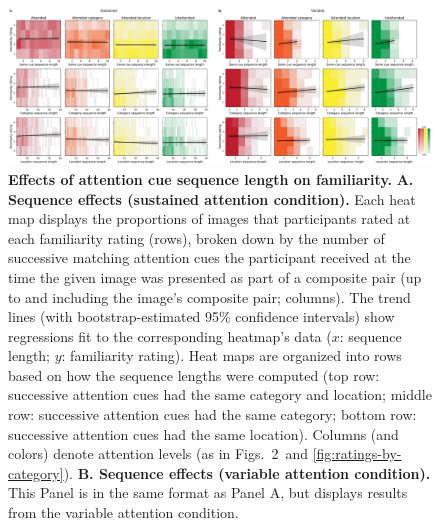 \documentclass{article}
\newcommand{\familiarity}{2}
\begin{document}
\begin{figure}[tp]
  \centering
  \includegraphics[width=1\textwidth]{figs/sequence_length_effects}

\caption{\textbf{Effects of attention cue sequence length on familiarity.} 
\textbf{A. Sequence effects (sustained attention condition).} Each heat map
displays the proportions of images that participants rated at each familiarity
rating (rows), broken down by the number of successive matching attention cues
the participant received at the time the given image was presented as part of a
composite pair (up to and including the image's composite pair; columns). The
trend lines (with bootstrap-estimated 95\% confidence intervals) show
regressions fit to the corresponding heatmap's data ($x$: sequence length; $y$:
familiarity rating). Heat maps are organized into rows based on how the sequence
lengths were computed (top row: successive attention cues had the same category
and location; middle row: successive attention cues had the same category;
bottom row: successive attention cues had the same location). Columns (and
colors) denote attention levels (as in Figs.~\familiarity~and
\ref{fig:ratings-by-category}). \textbf{B. Sequence effects (variable attention
condition).} This Panel is in the same format as Panel A, but displays results
from the variable attention condition.}

\label{fig:sequence-effects}
\end{figure}
\end{document}

